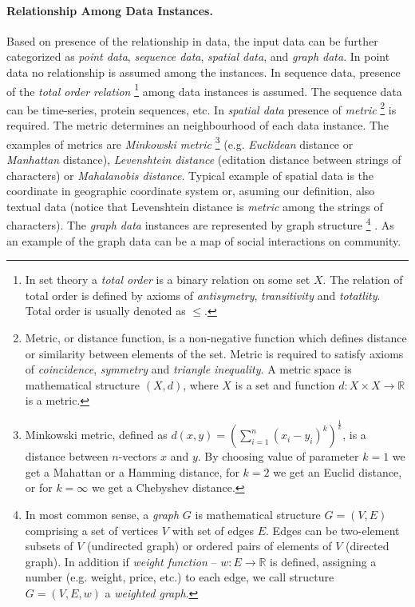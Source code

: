 \paragraph*{Relationship Among Data Instances.}

Based on presence of the relationship in data, the input data can be further categorized as
\emph{point data}, \emph{sequence data}, \emph{spatial data}, and \emph{graph data}. 
In point data no relationship is assumed among the instances.
In sequence data, presence of the \emph{total order relation}%
\footnote{%
 	In set theory a \emph{total order} is a binary relation on some set $X$. 
	The relation of total order is defined by axioms of \emph{antisymetry}, \emph{transitivity} 
	and \emph{totatlity}. Total order is usually denoted as $\le$.
} %
among data instances is assumed. The sequence data can be time-series, protein sequences, etc.
In \emph{spatial data} presence of \emph{metric}%
\footnote{
	Metric, or distance function, is a non-negative function which defines distance or 
	similarity between elements of the set. Metric is required to satisfy axioms of
	\emph{coincidence}, \emph{symmetry} and \emph{triangle inequality}.
	A metric space is mathematical structure $(X,d)$, where $X$ is a set and function  
	$d:X \times X \rightarrow \mathbb{R}$ is a metric. 
} %
is required. 
The metric determines an neighbourhood of each data instance. The examples of metrics are
\emph{Minkowski metric}%
\footnote{
	Minkowski metric, defined as $ d(x,y) = (\sum_{i=1}^n(x_i-y_i)^k )^\frac{1}{k}$, 
	is a distance between $n$-vectors $x$ and $y$.
	By choosing value of parameter $k=1$ we get a Mahattan or  a Hamming distance, 
	for $k=2$ we get an Euclid distance, or for $k=\infty $ we get a Chebyshev distance.
} %
(e.g. \emph{Euclidean} distance or \emph{Manhattan} distance), \emph{Levenshtein distance}
(editation distance between strings of characters) or \emph{Mahalanobis distance}.
Typical example of spatial data is the
coordinate in geographic coordinate system or, asuming our definition, also textual data 
(notice that Levenshtein distance is \emph{metric} among the strings of characters).
The \emph{graph data} instances are represented by graph structure%
\footnote{
	In most common sense, a \emph{graph} $G$ is mathematical structure $G=\left(V,E\right)$
	comprising a set of vertices $V$ with set of edges $E$.
	Edges can be two-element subsets of  $V$ (undirected graph) or ordered pairs 
	of elements of $V$ (directed graph).
	In addition if \emph{weight function} -- $w:E\rightarrow \mathbb{R} $ is defined, 
	assigning a number (e.g. weight, price, etc.) to each edge, we call structure
	$G=\left( V,E,w \right)$ a \emph{weighted graph}.
}%
. As an example of the graph data can be a map of social interactions on community.

